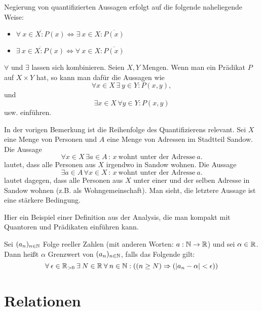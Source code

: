 \begin{bem}
	Negierung von quantifizierten Aussagen erfolgt auf die folgende naheliegende Weise: 
	\begin{itemize}
		\item $ \overline{\forall\: x \in X : P(x)} \Leftrightarrow \exists\: x \in X : \overline{P(x)} $
		\item $ \overline{\exists\: x \in X : P(x)} \Leftrightarrow \forall\: x \in X : \overline{P(x)} $
	\end{itemize}
\end{bem}


\begin{bem}
	$ \forall $ und $ \exists $ lassen sich kombinieren. Seien $X, Y$ Mengen. Wenn man ein Prädikat $ P $ auf $ X \times Y $ hat, so kann man dafür die Aussagen wie 
	\[
		 \forall x \in X \,\exists\: y \in Y : P(x,y), 
	\]
	und
	\[\exists x \in X  \, \forall y \in Y : P(x,y) 
	\]
	usw. einführen. 
\end{bem}


\begin{bem}
	In der vorigen Bemerkung ist die Reihenfolge des Quantifizierens relevant. Sei $X$ eine Menge von  Personen und $A$ eine Menge von Adressen im Stadtteil Sandow. Die Aussage 
	\[
		\forall x \in X \, \exists a \in A \, :\, x \ \text{wohnt unter der Adresse} \  a .
	\]
	lautet, dass alle Personen aus $X$ irgendwo in Sandow wohnen. Die Aussage 
	\[
		\exists a \in A \, \forall x \in X \,:\, x \ \text{wohnt unter der Adresse} \ a.
	\]
	lautet dagegen, dass alle Personen aus $X$ unter einer und der selben Adresse in Sandow wohnen (z.B. als Wohngemeinschaft). Man sieht, die letztere Aussage ist eine stärkere Bedingung. 
\end{bem} 

\begin{bsp}
	Hier ein Beispiel einer Definition aus der Analysis, die man kompakt mit Quantoren und Prädikaten einführen kann. 
	
	Sei $ (a_n)_{n \in \mathbb{N}} $ Folge reeller Zahlen (mit anderen Worten: $ a : \mathbb{N} \to \mathbb{R} $) und sei $ \alpha \in \mathbb{R} $. Dann heißt $ \alpha $ Grenzwert von $ (a_n)_{n \in \mathbb{N}} $, falls das Folgende gilt:
	\begin{equation*}
		\forall\: \epsilon \in \mathbb{R}_{>0} \:\exists\: N \in \mathbb{R} \:\forall\: n \in \mathbb{N}: \left( (n \geq N) \Rightarrow (|a_n - \alpha| < \epsilon) \right)
	\end{equation*}
\end{bsp} 

\section{Relationen}


